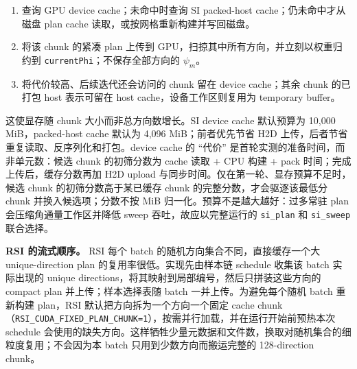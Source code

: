 \documentclass[11pt,a4paper]{article}
\begin{document}
\begin{enumerate}
\item 查询 GPU device cache；未命中时查询 SI packed-host cache；仍未命中才从磁盘 plan cache 读取，或按网格重新构建并写回磁盘。
\item 将该 chunk 的紧凑 plan 上传到 GPU，扫掠其中所有方向，并立刻以权重归约到 \texttt{currentPhi}；不保存全部方向的 $\psi_m$。
\item 将代价较高、后续迭代还会访问的 chunk 留在 device cache；其余 chunk 的已打包 host 表示可留在 host cache，设备工作区则复用为 temporary buffer。
\end{enumerate}
这使显存随 chunk 大小而非总方向数增长。SI device cache 默认预算为 10,000 MiB，packed-host cache 默认为 4,096 MiB；前者优先节省 H2D 上传，后者节省重复读取、反序列化和打包。device cache 的 ``代价'' 是首轮实测的准备时间，而非单元数：候选 chunk 的初筛分数为 cache 读取 + CPU 构建 + pack 时间；完成上传后，缓存分数再加 H2D upload 与同步时间。仅在第一轮、显存预算不足时，候选 chunk 的初筛分数高于某已缓存 chunk 的完整分数，才会驱逐该最低分 chunk 并换入候选项；分数不按 MiB 归一化。预算不是越大越好：过多常驻 plan 会压缩角通量工作区并降低 sweep 吞吐，故应以完整运行的 \texttt{si\_plan} 和 \texttt{si\_sweep} 联合选择。

\textbf{RSI 的流式顺序。} RSI 每个 batch 的随机方向集合不同，直接缓存一个大 unique-direction plan 的复用率很低。实现先由样本链 schedule 收集该 batch 实际出现的 unique directions，将其映射到局部编号，然后只拼装这些方向的 compact plan 并上传；样本选择表随 batch 一并上传。为避免每个随机 batch 重新构建 plan，RSI 默认把方向拆为一个方向一个固定 cache chunk（\texttt{RSI\_CUDA\_FIXED\_PLAN\_CHUNK=1}），按需并行加载，并在运行开始前预热本次 schedule 会使用的缺失方向。这样牺牲少量元数据和文件数，换取对随机集合的细粒度复用；不会因为本 batch 只用到少数方向而搬运完整的 128-direction chunk。
\end{document}

